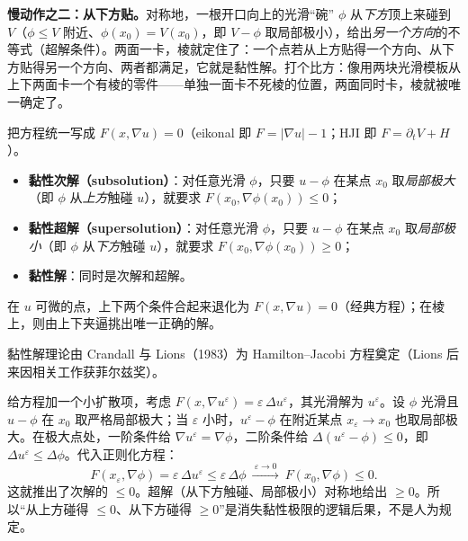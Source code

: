 \textbf{慢动作之二：从下方贴。}\;对称地，一根开口向上的光滑“碗” $\phi$ 从\emph{下方}顶上来碰到 $V$（$\phi\le V$ 附近、$\phi(x_0)=V(x_0)$，即 $V-\phi$ 取局部极小），给出\emph{另一个方向}的不等式（超解条件）。两面一卡，棱就定住了：一个点若从上方贴得一个方向、从下方贴得另一个方向、两者都满足，它就是黏性解。打个比方：像用两块光滑模板从上下两面卡一个有棱的零件——单独一面卡不死棱的位置，两面同时卡，棱就被唯一确定了。

\begin{definition}[黏性解]
\label{def:dg-viscosity}
把方程统一写成 $F(x,\nabla u)=0$（eikonal 即 $F=|\nabla u|-1$；HJI 即 $F=\partial_t V+H$）。
\begin{itemize}
  \item \textbf{黏性次解（subsolution）}：对任意光滑 $\phi$，只要 $u-\phi$ 在某点 $x_0$ 取\emph{局部极大}（即 $\phi$ 从\emph{上方}触碰 $u$），就要求 $F(x_0,\nabla\phi(x_0))\le 0$；
  \item \textbf{黏性超解（supersolution）}：对任意光滑 $\phi$，只要 $u-\phi$ 在某点 $x_0$ 取\emph{局部极小}（即 $\phi$ 从\emph{下方}触碰 $u$），就要求 $F(x_0,\nabla\phi(x_0))\ge 0$；
  \item \textbf{黏性解}：同时是次解和超解。
\end{itemize}
在 $u$ 可微的点，上下两个条件合起来退化为 $F(x,\nabla u)=0$（经典方程）；在棱上，则由上下夹逼挑出唯一正确的解。
\end{definition}

黏性解理论由 Crandall 与 Lions（1983）为 Hamilton--Jacobi 方程奠定\cite{crandall1983viscosity}（Lions 后来因相关工作获菲尔兹奖）。

\begin{derivation}
\label{deriv:dg-vanishing}
给方程加一个小扩散项，考虑 $F(x,\nabla u^\varepsilon)=\varepsilon\,\Delta u^\varepsilon$，其光滑解为 $u^\varepsilon$。设 $\phi$ 光滑且 $u-\phi$ 在 $x_0$ 取严格局部极大；当 $\varepsilon$ 小时，$u^\varepsilon-\phi$ 在附近某点 $x_\varepsilon\to x_0$ 也取局部极大。在极大点处，一阶条件给 $\nabla u^\varepsilon=\nabla\phi$，二阶条件给 $\Delta(u^\varepsilon-\phi)\le 0$，即 $\Delta u^\varepsilon\le\Delta\phi$。代入正则化方程：
\[
  F(x_\varepsilon,\nabla\phi)=\varepsilon\,\Delta u^\varepsilon\le\varepsilon\,\Delta\phi\ \xrightarrow{\ \varepsilon\to 0\ }\ F(x_0,\nabla\phi)\le 0.
\]
这就推出了次解的 $\le 0$。超解（从下方触碰、局部极小）对称地给出 $\ge 0$。所以“从上方碰得 $\le 0$、从下方碰得 $\ge 0$”是消失黏性极限的逻辑后果，不是人为规定。
\end{derivation}

